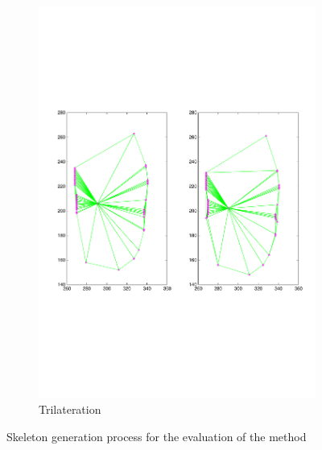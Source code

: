 \begin{figure}[t]
        \begin{subfigure}[b]{0.45\textwidth}
                \centering
                \includegraphics[width=\textwidth, trim=40 230 30 220,clip]{fig22.pdf}
                \caption{Trilateration}
                \label{fig:cp02_err_measure_trilateration}
        \end{subfigure}

        \caption{Skeleton generation process for the evaluation of the method}\label{fig:cp02_err_measure_skeleton}
\end{figure}

